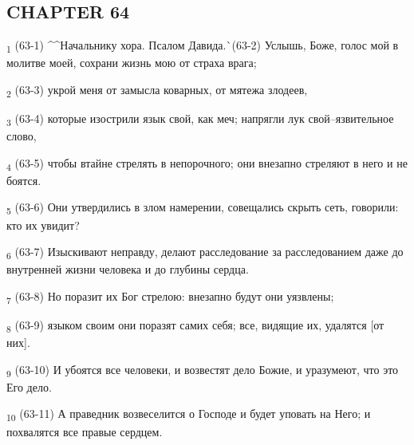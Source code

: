 \subsection{CHAPTER 64}
\begin{tcolorbox}
\textsubscript{1} (63-1) ^^Начальнику хора. Псалом Давида.^^ (63-2) Услышь, Боже, голос мой в молитве моей, сохрани жизнь мою от страха врага;
\end{tcolorbox}
\begin{tcolorbox}
\textsubscript{2} (63-3) укрой меня от замысла коварных, от мятежа злодеев,
\end{tcolorbox}
\begin{tcolorbox}
\textsubscript{3} (63-4) которые изострили язык свой, как меч; напрягли лук свой--язвительное слово,
\end{tcolorbox}
\begin{tcolorbox}
\textsubscript{4} (63-5) чтобы втайне стрелять в непорочного; они внезапно стреляют в него и не боятся.
\end{tcolorbox}
\begin{tcolorbox}
\textsubscript{5} (63-6) Они утвердились в злом намерении, совещались скрыть сеть, говорили: кто их увидит?
\end{tcolorbox}
\begin{tcolorbox}
\textsubscript{6} (63-7) Изыскивают неправду, делают расследование за расследованием даже до внутренней жизни человека и до глубины сердца.
\end{tcolorbox}
\begin{tcolorbox}
\textsubscript{7} (63-8) Но поразит их Бог стрелою: внезапно будут они уязвлены;
\end{tcolorbox}
\begin{tcolorbox}
\textsubscript{8} (63-9) языком своим они поразят самих себя; все, видящие их, удалятся [от них].
\end{tcolorbox}
\begin{tcolorbox}
\textsubscript{9} (63-10) И убоятся все человеки, и возвестят дело Божие, и уразумеют, что это Его дело.
\end{tcolorbox}
\begin{tcolorbox}
\textsubscript{10} (63-11) А праведник возвеселится о Господе и будет уповать на Него; и похвалятся все правые сердцем.
\end{tcolorbox}
